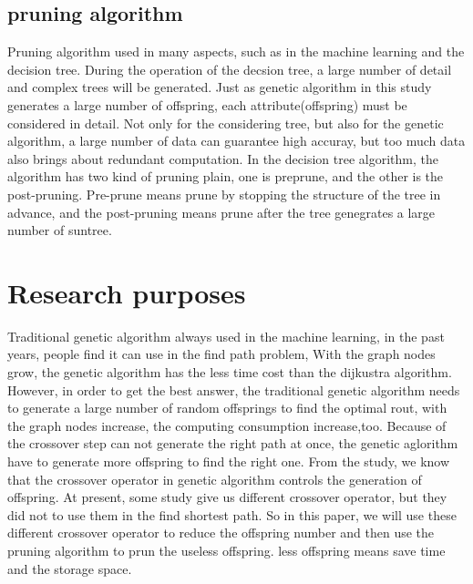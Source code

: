 \documentclass[12pt]{article}
\begin{document}
\subsection{pruning algorithm}
Pruning algorithm used in many aspects, such as in the machine learning and the decision tree. During the operation of the decsion tree, a large number of detail and complex trees will be generated. Just as genetic algorithm in this study generates a large number of offspring, each attribute(offspring) must be considered in detail. Not only for the considering tree, but also for the genetic algorithm, a large number of data can guarantee high accuray, but too much data also brings about redundant computation.  In the decision tree algorithm, the algorithm has two kind of pruning plain, one is preprune, and the other is the post-pruning. Pre-prune means prune  by stopping the structure of the tree in advance, and the post-pruning means prune after the tree genegrates a large number of suntree.
\section{Research purposes}
Traditional genetic algorithm always used in the machine learning, in the past years, people find it can use in the find path problem, With the graph nodes grow, the genetic algorithm has the less time cost than the dijkustra algorithm. However, in order to get the best answer, the traditional genetic algorithm needs to generate a large number of random offsprings to find the optimal rout, with the graph nodes increase, the computing consumption increase,too. Because of the crossover step can not generate the right path at once, the genetic aglorithm have to generate more offspring to find the right one. From the study, we know that the crossover operator in genetic algorithm controls the generation of offspring. At present, some study give us different crossover operator, but they did not to use them in the find shortest path. So in this paper, we will use these different crossover operator to reduce the offspring number and then use the pruning algorithm to prun the useless offspring. less offspring means save time and the storage space.
\end{document}

